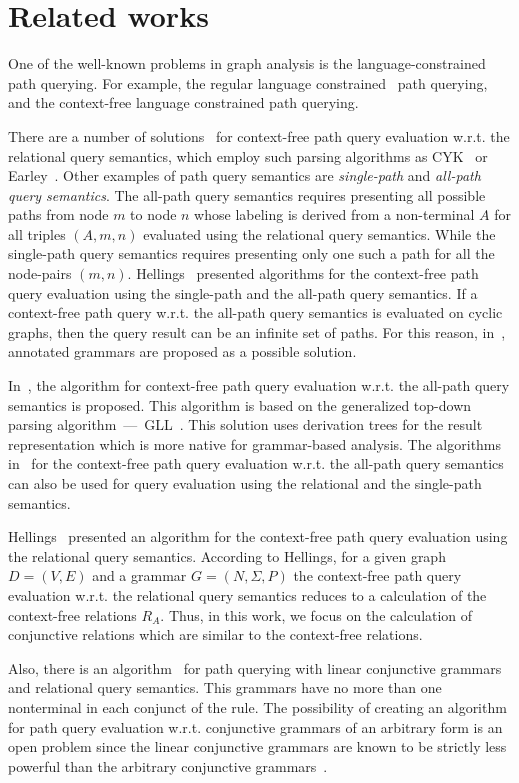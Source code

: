 \section{Related works} \label{section_related}
 One of the well-known problems in graph analysis is the language-constrained path querying. For example, the regular language constrained~\cite{abiteboul1997regular,fan2011adding,nole2016regular,reutter2017regular} path querying, and the context-free language constrained path querying.

There are a number of solutions~\cite{azimov2018context,hellingsRelational,GraphQueryWithEarley,RDF} for context-free path query evaluation w.r.t. the relational query semantics, which employ such parsing algorithms as CYK~\cite{kasami,younger} or Earley~\cite{Grune}. Other examples of path query semantics are \textit{single-path} and \textit{all-path query semantics}. The all-path query semantics requires presenting all possible paths from node $m$ to node $n$ whose labeling is derived from a non-terminal $A$ for all triples $(A, m, n)$ evaluated using the relational query semantics. While the single-path query semantics requires presenting only one such a path for all the node-pairs $(m, n)$. Hellings~\cite{hellingsPathQuerying} presented algorithms for the context-free path query evaluation using the single-path and the all-path query semantics. If a context-free path query w.r.t. the all-path query semantics is evaluated on cyclic graphs, then the query result can be an infinite set of paths. For this reason, in~\cite{hellingsPathQuerying}, annotated grammars are proposed as a possible solution.

In~\cite{GLL}, the algorithm for context-free path query evaluation w.r.t. the all-path query semantics is proposed. This algorithm is based on the generalized top-down parsing algorithm~---~GLL~\cite{scott2010gll}. This solution uses derivation trees for the result representation which is more native for grammar-based analysis. The algorithms in~\cite{GLL,hellingsPathQuerying} for the context-free path query evaluation w.r.t. the all-path query semantics can also be used for query evaluation using the relational and the single-path semantics.

Hellings~\cite{hellingsRelational} presented an algorithm for the context-free path query evaluation using the relational query semantics. According to Hellings, for a given graph $D = (V, E)$ and a grammar $G = (N, \Sigma, P)$ the context-free path query evaluation w.r.t. the relational query semantics reduces to a calculation of the context-free relations $R_A$. Thus, in this work, we focus on the calculation of conjunctive relations which are similar to the context-free relations.


Also, there is an algorithm~\cite{zhang2017context} for path querying with linear conjunctive grammars and relational query semantics. This grammars have no more than one nonterminal in each conjunct of the rule. The possibility of creating an algorithm for path query evaluation w.r.t. conjunctive grammars of an arbitrary form is an open problem since the linear conjunctive grammars are known to be strictly less powerful than the arbitrary conjunctive grammars~\cite{okhotinConjAndBool}.